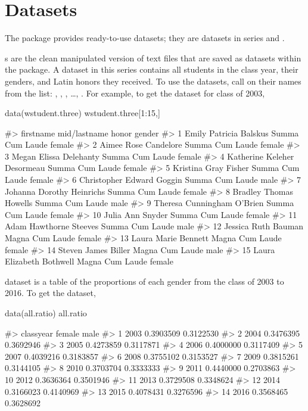 \section{Datasets}\label{datasets}

The package provides ready-to-use datasets; they are datasets in
 series and .

s are the clean manipulated version of text files
that are saved as datasets within the package. A dataset in this series
contains all students in the class year, their genders, and Latin honors
they received. To use the datasets, call  on their names
from the list: , ,
, \ldots{}, . For example, to
get the dataset for class of 2003,

\begin{Schunk}
\begin{Sinput}
data(wstudent.three)
wstudent.three[1:15,]
\end{Sinput}
\begin{Soutput}
#>      firstname       mid/lastname           honor gender
#> 1        Emily   Patricia Balskus Summa Cum Laude female
#> 2        Aimee     Rose Candelore Summa Cum Laude female
#> 3        Megan   Elissa Delehanty Summa Cum Laude female
#> 4    Katherine  Keleher Desormeau Summa Cum Laude female
#> 5     Kristina        Gray Fisher Summa Cum Laude female
#> 6  Christopher      Edward Goggin Summa Cum Laude   male
#> 7      Johanna  Dorothy Heinrichs Summa Cum Laude female
#> 8      Bradley     Thomas Howells Summa Cum Laude   male
#> 9      Theresa Cunningham O’Brien Summa Cum Laude female
#> 10       Julia         Ann Snyder Summa Cum Laude female
#> 11        Adam  Hawthorne Steeves Summa Cum Laude   male
#> 12     Jessica        Ruth Bauman Magna Cum Laude female
#> 13       Laura      Marie Bennett Magna Cum Laude female
#> 14      Steven       James Biller Magna Cum Laude   male
#> 15       Laura Elizabeth Bothwell Magna Cum Laude female
\end{Soutput}
\end{Schunk}

 dataset is a table of the proportions of each gender
from the class of 2003 to 2016. To get the dataset,

\begin{Schunk}
\begin{Sinput}
data(all.ratio)
all.ratio
\end{Sinput}
\begin{Soutput}
#>    classyear    female      male
#> 1       2003 0.3903509 0.3122530
#> 2       2004 0.3476395 0.3692946
#> 3       2005 0.4273859 0.3117871
#> 4       2006 0.4000000 0.3117409
#> 5       2007 0.4039216 0.3183857
#> 6       2008 0.3755102 0.3153527
#> 7       2009 0.3815261 0.3144105
#> 8       2010 0.3703704 0.3333333
#> 9       2011 0.4440000 0.2703863
#> 10      2012 0.3636364 0.3501946
#> 11      2013 0.3729508 0.3348624
#> 12      2014 0.3166023 0.4140969
#> 13      2015 0.4078431 0.3276596
#> 14      2016 0.3568465 0.3628692
\end{Soutput}
\end{Schunk}

